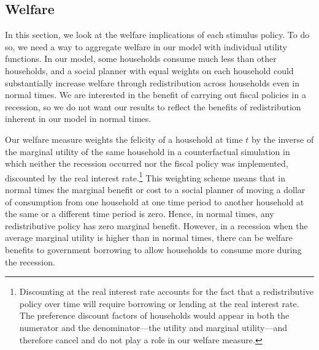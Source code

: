 \documentclass[\latexroot/\projectname]{subfiles}
\begin{document}
\subsection{Welfare}
\whenintegrated{\label{sec:welfare}} %

In this section, we look at the welfare implications of each stimulus policy.
To do so, we need a way to aggregate welfare in our model with individual utility functions.
In our model, some households consume much less than other households, and a social planner with equal weights on each household could substantially increase welfare through redistribution across households even in normal times.
We are interested in the benefit of carrying out fiscal policies in a recession, so we do not want our results to reflect the benefits of redistribution inherent in our model in normal times.

Our welfare measure weights the felicity of a household at time $t$ by the inverse of the marginal utility of the same household in a counterfactual simulation in which neither the recession occurred nor the fiscal policy was implemented, discounted by the real interest rate.\footnote{Discounting at the real interest rate accounts for the fact that a redistributive policy over time will require borrowing or lending at the real interest rate.
  The preference discount factors of households would appear in both the numerator and the denominator---the utility and marginal utility---and therefore cancel and do not play a role in our welfare measure.} This weighting scheme means that in normal times the marginal benefit or cost to a social planner of moving a dollar of consumption from one household at one time period to another household at the same or a different time period is zero.
Hence, in normal times, any redistributive policy has zero marginal benefit.
However, in a recession when the average marginal utility is higher than in normal times, there can be welfare benefits to government borrowing to allow households to consume more during the recession.
\end{document}
